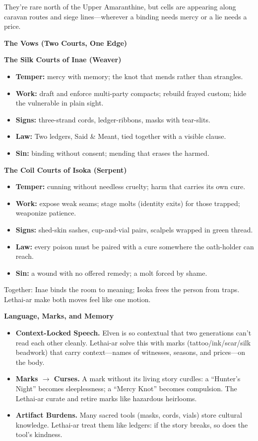 \documentclass[11pt]{article}
\begin{document}
  They're rare north of the Upper Amaranthine, but cells are appearing along caravan routes and siege lines---wherever a binding needs mercy or a lie needs a price.
  
  \bigskip
  
  \textbf{The Vows (Two Courts, One Edge)}
  
  \textbf{The Silk Courts of Inae (Weaver)}
  \begin{itemize}
  \item \textbf{Temper:} mercy with memory; the knot that mends rather than strangles.
  \item \textbf{Work:} draft and enforce multi-party compacts; rebuild frayed custom; hide the vulnerable in plain sight.
  \item \textbf{Signs:} three-strand cords, ledger-ribbons, masks with tear-slits.
  \item \textbf{Law:} Two ledgers, Said \& Meant, tied together with a visible clause.
  \item \textbf{Sin:} binding without consent; mending that erases the harmed.
  \end{itemize}
  
  \textbf{The Coil Courts of Isoka (Serpent)}
  \begin{itemize}
  \item \textbf{Temper:} cunning without needless cruelty; harm that carries its own cure.
  \item \textbf{Work:} expose weak seams; stage molts (identity exits) for those trapped; weaponize patience.
  \item \textbf{Signs:} shed-skin sashes, cup-and-vial pairs, scalpels wrapped in green thread.
  \item \textbf{Law:} every poison must be paired with a cure somewhere the oath-holder can reach.
  \item \textbf{Sin:} a wound with no offered remedy; a molt forced by shame.
  \end{itemize}
  
  Together: Inae binds the room to meaning; Isoka frees the person from traps. Lethai-ar make both moves feel like one motion.
  
  \bigskip
  
  \textbf{Language, Marks, and Memory}
  \begin{itemize}
  \item \textbf{Context-Locked Speech.} Elven is so contextual that two generations can't read each other cleanly. Lethai-ar solve this with marks (tattoo/ink/scar/silk beadwork) that carry context---names of witnesses, seasons, and prices---on the body.
  \item \textbf{Marks $\rightarrow$ Curses.} A mark without its living story curdles: a ``Hunter's Night'' becomes sleeplessness; a ``Mercy Knot'' becomes compulsion. The Lethai-ar curate and retire marks like hazardous heirlooms.
  \item \textbf{Artifact Burdens.} Many sacred tools (masks, cords, vials) store cultural knowledge. Lethai-ar treat them like ledgers: if the story breaks, so does the tool's kindness.
  \end{itemize}
  
\end{document}
